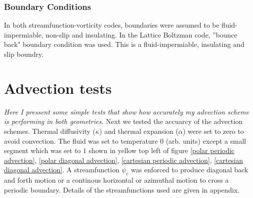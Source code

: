 \documentclass{article}
\begin{document}
\subsubsection*{Boundary Conditions}
In both streamfunction-vorticity codes, boundaries were assumed to be fluid-impermiable, non-slip and insulating. In the Lattice Boltzman code, ''bounce 
back" boundary condition was used. This is a fluid-impermiable, insulating and slip boundry.

\section*{Advection tests}
{\it{Here I pressent some simple tests that show how accurately my advection scheme is performing in both geometries.}}
\vspace{0.3cm}
\noindent Next we tested the accuarcy of the advection schemes. Thermal diffusivity ($\kappa$) and thermal expansion ($\alpha$) were set to zero to avoid convection. The fluid was set to temperature 0 (arb. units) except a small segment which was set to $1$ shown in yellow top left of figure \ref{polar periodic advection}, \ref{polar diagonal advection}, \ref{cartesian periodic advection}, \ref{cartesian diagonal advection}. A streamfunction $\psi_c$ was enforced to produce diagonal back and forth motion or a continous horizontal or azimuthal motion to cross a periodic boundary. Details of the streamfunctions used are given in appendix.
\end{document}
